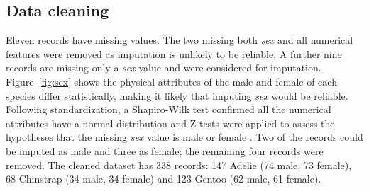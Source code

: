 \documentclass[a4paper, 11pt]{article}
\begin{document}
\vspace{\baselineskip}
\subsection*{Data cleaning}

Eleven records have missing values. 
The two missing both \textit{sex} and all numerical features were removed as imputation is unlikely to be reliable. 
A further nine records are missing only a \textit{sex} value and were considered for imputation. 
Figure~\ref{fig:sex} shows the physical 
attributes of the male and female of each species differ statistically, making it likely that imputing \textit{sex} would be reliable. Following standardization, 
a Shapiro-Wilk test confirmed all the numerical attributes have a normal distribution \cite{shapiro1965analysis} 
and Z-tests were applied to assess the 
hypotheses that the missing \textit{sex} value is male or female \cite{freedman2007statistics}. 
Two of the records could be imputed as male and three as female; the 
remaining four records were removed. 
The cleaned dataset has 338 records: 147 Adelie  
(74 male, 73 female), 68 Chinstrap (34 male, 34 female) and 123 Gentoo (62 male, 61 female).
\end{document}
